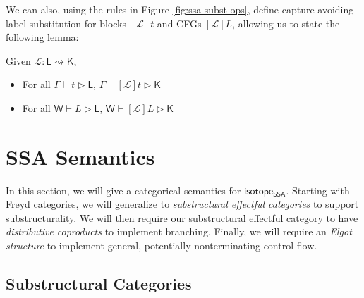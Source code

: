 \documentclass[acmsmall,screen,review]{acmart}
\newcommand{\mc}[1]{\ensuremath{\mathcal{#1}}}
\newcommand{\ms}[1]{\ensuremath{\mathsf{#1}}}
\newcommand{\haslb}[3]{#1 \vdash #2 \rhd #3}
\newcommand{\lhaslb}[3]{#1 \vdash #2 \rhd #3}
\newcommand{\lbsubst}[3]{#1: #2 \rightsquigarrow #3}
\newcommand{\isotopessa}{\ms{isotope_{SSA}}}
\begin{document}
We can also, using the rules in Figure \ref{fig:ssa-subst-ops}, define
capture-avoiding label-substitution for blocks \([\mc{L}]t\) and CFGs
\([\mc{L}]L\), allowing us to state the following lemma:
\begin{lemma} 
  Given \(\lbsubst{\mc{L}}{\ms{L}}{\ms{K}}\), 
  \begin{itemize}
    \item For all \(\haslb{\Gamma}{t}{\ms{L}}\),
    \(\haslb{\Gamma}{[\mc{L}]t}{\ms{K}}\)
    \item For all \(\lhaslb{\ms{W}}{L}{\ms{L}}\),
    \(\lhaslb{\ms{W}}{[\mc{L}]L}{\ms{K}}\)
  \end{itemize}
\end{lemma}

\section{SSA Semantics}

\label{sec:semantics}

In this section, we will give a categorical semantics for \isotopessa. Starting
with Freyd categories, we will generalize to \textit{substructural effectful
categories} to support substructurality. We will then require our substructural
effectful category to have \textit{distributive coproducts} to implement
branching. Finally, we will require an \textit{Elgot structure} to implement
general, potentially nonterminating control flow.

\subsection{Substructural Categories}
\end{document}

